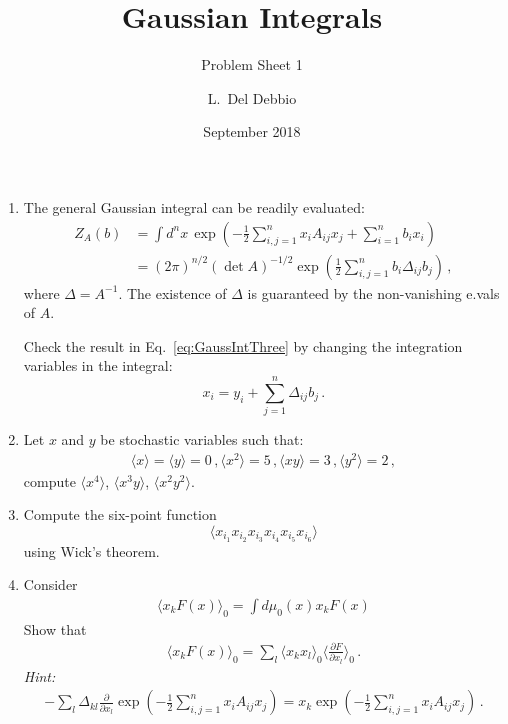 \documentclass{tutorial}
\subtitle{Problem Sheet 1}
\title{Gaussian Integrals}
\author{L.~Del Debbio}
\date{September 2018}
\begin{document}
\maketitle

\begin{enumerate}

\item The general Gaussian integral can be readily evaluated:
  \begin{align}
    Z_A(b) &= \int d^nx\, \exp\left(
             -\frac12 \sum_{i,j=1}^n x_i A_{ij} x_j
             + \sum_{i=1}^n b_i x_i
             \right) \\
    \label{eq:GaussIntThree}
           &=  \left(2\pi\right)^{n/2} \left(\det A \right)^{-1/2}
             \exp\left(
             \frac12 \sum_{i,j=1}^n b_i \Delta_{ij} b_j
             \right) \, ,
  \end{align}
  where $\Delta = A^{-1}$. The existence of $\Delta$ is guaranteed by
  the non-vanishing e.vals of $A$.

  Check the result in Eq.~\ref{eq:GaussIntThree} by changing the
  integration variables in the integral:
  \[
    x_i = y_i + \sum_{j=1}^n \Delta_{ij} b_j\, .
  \]

\item Let $x$ and $y$ be stochastic variables such that:
  \begin{align*}
    \langle x \rangle = \langle y \rangle =0\, ,
    \langle x^2 \rangle = 5\, ,
    \langle x y \rangle = 3 \, ,
    \langle y^2 \rangle = 2\, ,
  \end{align*}
  compute $\langle x^4\rangle$, $\langle x^3 y \rangle$, $\langle x^2
  y^2\rangle$.  

\item Compute the six-point function
  \[
    \langle x_{i_1} x_{i_2} x_{i_3} x_{i_4} x_{i_5} x_{i_6} \rangle    
  \]
  using Wick's theorem. 

\item Consider 
  \begin{align}
    \langle x_k F(x) \rangle_0 = 
    \int d\mu_0(x) x_k F(x) 
  \end{align}
  Show that
  \begin{align}
    \langle x_k F(x) \rangle_0  = 
    \sum_l \langle x_k x_l \rangle_0 \langle \frac{\partial F}{\partial x_l}\rangle_0\, .
  \end{align}
  {\em Hint:} 
  \begin{align}
    - \sum_l \Delta_{kl} \frac{\partial}{\partial x_l}
    \exp\left(
    -\frac12 \sum_{i,j=1}^n x_i A_{ij} x_j
    \right) = 
    x_k \exp\left(
    -\frac12 \sum_{i,j=1}^n x_i A_{ij} x_j
    \right)\, .
  \end{align}


\end{enumerate}
\end{document}
